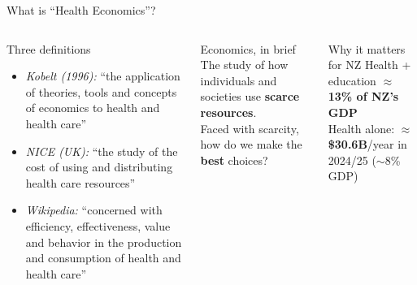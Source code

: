 \documentclass[aspectratio=169, 12pt]{beamer}
\begin{document}
\begin{frame}{What is ``Health Economics''?}
	\begin{columns}
		\begin{block}{Three definitions}
			{\small\begin{itemize}\setlength{\itemsep}{0.1em}
				\item \textit{Kobelt (1996):} ``the application of theories, tools and concepts of economics to health and health care''
				\item \textit{NICE (UK):} ``the study of the cost of using and distributing health care resources''
				\item \textit{Wikipedia:} ``concerned with efficiency, effectiveness, value and behavior in the production and consumption of health and health care''
			\end{itemize}}
		\end{block}
		\begin{alertblock}{Economics, in brief}
			{\small The study of how individuals and societies use \textbf{scarce resources}.\\[0.3em]
			Faced with scarcity, how do we make the \textbf{best} choices?}
		\end{alertblock}
		\vspace{0.3em}
		\begin{exampleblock}{Why it matters for NZ}
			{\small Health + education $\approx$ \textbf{13\% of NZ's GDP}\\
			Health alone: $\approx$\textbf{\$30.6B}/year in 2024/25 ($\sim$8\% GDP)}
		\end{exampleblock}
	\end{columns}
\end{frame}
\end{document}
